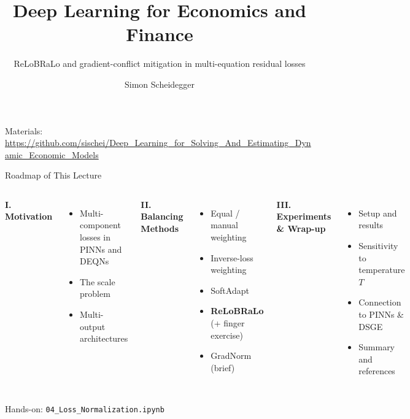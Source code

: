 \documentclass[aspectratio=169,11pt]{beamer}
\title[Deep Learning for Dynamic Economic Models]
{Deep Learning for Economics and Finance}
\subtitle{ReLoBRaLo and gradient-conflict mitigation in multi-equation residual losses}
\author{Simon Scheidegger}
\institute[HEC Lausanne]{HEC, University of Lausanne}
\date{}
\begin{document}
\newcommand{\exercisepause}{%
  \tikz[baseline=(X.base)]{\node[fill=darkgreen!80!black, text=white,
  rounded corners=2pt, inner sep=3pt, font=\scriptsize\bfseries](X){PAUSE --- 5 min};}}



{
\begin{frame}
\titlepage
\vspace{-0.4cm}
\begin{center}
{\footnotesize Materials: \url{https://github.com/sischei/Deep_Learning_for_Solving_And_Estimating_Dynamic_Economic_Models}}
\end{center}
\end{frame}
}

\begin{frame}{Roadmap of This Lecture}
\begin{columns}[T]
\textbf{I. Motivation}
\begin{itemize}
    \item Multi-component losses in PINNs and DEQNs
    \item The scale problem
    \item Multi-output architectures
\end{itemize}

\vspace{0.4em}
\textbf{II. Balancing Methods}
\begin{itemize}
    \item Equal / manual weighting
    \item Inverse-loss weighting
    \item SoftAdapt
    \item \textbf{ReLoBRaLo} (+ finger exercise)
    \item GradNorm (brief)
\end{itemize}

\textbf{III. Experiments \& Wrap-up}
\begin{itemize}
    \item Setup and results
    \item Sensitivity to temperature $T$
    \item Connection to PINNs \& DSGE
    \item Summary and references
\end{itemize}
\end{columns}

\vspace{0.2em}
\begin{center}
{\scriptsize Hands-on: \texttt{04\_Loss\_Normalization.ipynb}}
\end{center}
\end{frame}
\end{document}
